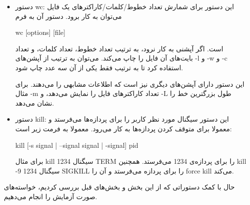 \documentclass[12pt]{article}
\begin{document}
\begin{itemize}
            \item دستور \textenglish{wc}:
            \cite{gnu-coreutils-wc}
            این دستور برای شمارش تعداد خطوط/کلمات/کاراکترهای یک فایل می‌توان به کار برود. دستور آن به فرم

            \begin{english}
                wc [options] [file]
            \end{english}

            است. اگر آپشنی به کار نرود، به ترتیب تعداد خطوط، تعداد کلمات، و تعداد بایت‌های آن فایل را چاپ می‌کند. می‌توان به ترتیب از آپشن‌های
            \textenglish{-l}
            و 
            \textenglish{-w}
            و
            \textenglish{-c}
            استفاده کرد تا به ترتیب فقط یکی از آن سه عدد چاپ شود.

            این دستور دارای آپشن‌های دیگری نیز است که اطلاعات مشابهی را می‌دهند. برای مثال 
            \textenglish{-m}
            تعداد کاراکترهای فایل را نمایش می‌دهد، و 
            \textenglish{-L}
            طول بزرگترین خط را نشان می‌دهد.

            \item دستور \textenglish{kill}:
            \cite{gnu-coreutils-kill}
            این دستور سیگنال مورد نظر کاربر را برای پردازه‌ها می‌فرستد و  معمولا برای متوقف کردن پردازه‌ها به کار می‌رود. معمولا به فرمت زیر است:

            \begin{english}
                kill [-s signal | --signal signal | -signal] pid
            \end{english}

            برای مثال 
            \textenglish{kill 1234}
            سیگنال
            TERM
            را برای پردازه‌ی 1234 می‌فرستد. همچنین
            \textenglish{kill -9 1234}
            سیگنال 
            SIGKILL
            را برای پردازه می‌فرستد و آن را 
            \textenglish{force kill}
            می‌کند.
            
        \end{itemize}

        حال با کمک دستوراتی که از این بخش و بخش‌های قبل بررسی کردیم، خواسته‌های صورت آزمایش را انجام می‌دهیم.
\end{document}
